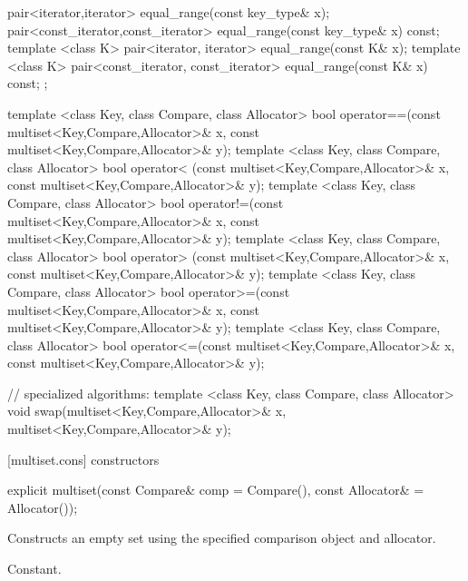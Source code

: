 \begin{codeblock}
{{    pair<iterator,iterator>             equal_range(const key_type& x);
    pair<const_iterator,const_iterator> equal_range(const key_type& x) const;
    template <class K>
      pair<iterator, iterator>             equal_range(const K& x);
    template <class K>
      pair<const_iterator, const_iterator> equal_range(const K& x) const;
  };

  template <class Key, class Compare, class Allocator>
    bool operator==(const multiset<Key,Compare,Allocator>& x,
                    const multiset<Key,Compare,Allocator>& y);
  template <class Key, class Compare, class Allocator>
    bool operator< (const multiset<Key,Compare,Allocator>& x,
                    const multiset<Key,Compare,Allocator>& y);
  template <class Key, class Compare, class Allocator>
    bool operator!=(const multiset<Key,Compare,Allocator>& x,
                    const multiset<Key,Compare,Allocator>& y);
  template <class Key, class Compare, class Allocator>
    bool operator> (const multiset<Key,Compare,Allocator>& x,
                    const multiset<Key,Compare,Allocator>& y);
  template <class Key, class Compare, class Allocator>
    bool operator>=(const multiset<Key,Compare,Allocator>& x,
                    const multiset<Key,Compare,Allocator>& y);
  template <class Key, class Compare, class Allocator>
    bool operator<=(const multiset<Key,Compare,Allocator>& x,
                    const multiset<Key,Compare,Allocator>& y);

  // specialized algorithms:
  template <class Key, class Compare, class Allocator>
    void swap(multiset<Key,Compare,Allocator>& x,
              multiset<Key,Compare,Allocator>& y);
}
\end{codeblock}%
%

[multiset.cons]{ constructors}

%
%
\begin{itemdecl}
explicit multiset(const Compare& comp = Compare(),
                  const Allocator& = Allocator());
\end{itemdecl}

\begin{itemdescr}
\pnum
\effects
Constructs an empty set using the specified comparison object and allocator.

\pnum
\complexity
Constant.
\end{itemdescr}

